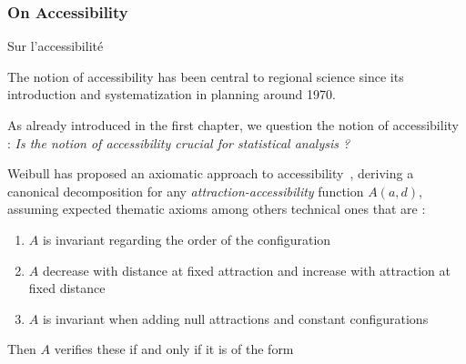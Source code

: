 \subsubsection{On Accessibility}{Sur l'accessibilité}


The notion of accessibility has been central to regional science since its introduction and systematization in planning around 1970. 





As already introduced in the first chapter, we question the notion of accessibility : \textit{Is the notion of accessibility crucial for statistical analysis ?}

\medskip


Weibull has proposed an axiomatic approach to accessibility~\cite{weibull1976axiomatic}, deriving a canonical decomposition for any \emph{attraction-accessibility} function $A(a,d)$, assuming expected thematic axioms among others technical ones that are :
\begin{enumerate}
\item $A$ is invariant regarding the order of the configuration
\item $A$ decrease with distance at fixed attraction and increase with attraction at fixed distance
\item $A$ is invariant when adding null attractions and constant configurations
\end{enumerate}
Then $A$ verifies these if and only if it is of the form

